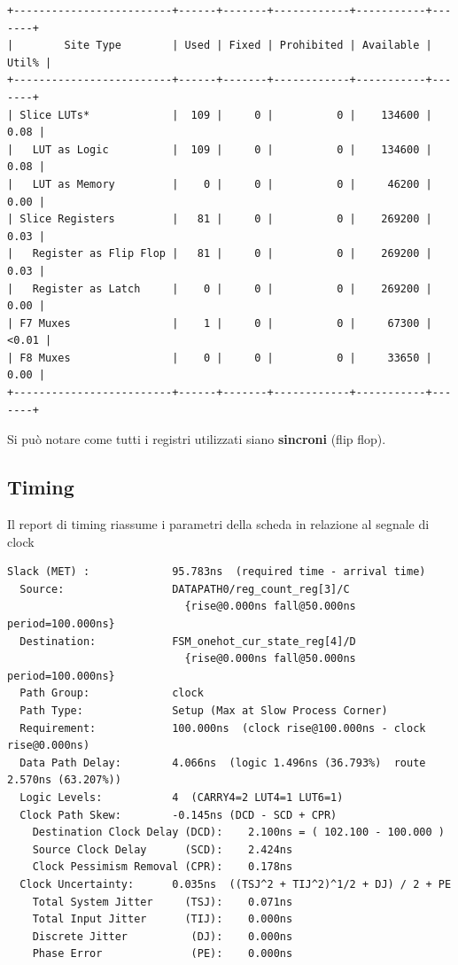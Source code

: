 \documentclass[a4paper]{report}
\begin{document}
\begin{verbatim}
+-------------------------+------+-------+------------+-----------+-------+
|        Site Type        | Used | Fixed | Prohibited | Available | Util% |
+-------------------------+------+-------+------------+-----------+-------+
| Slice LUTs*             |  109 |     0 |          0 |    134600 |  0.08 |
|   LUT as Logic          |  109 |     0 |          0 |    134600 |  0.08 |
|   LUT as Memory         |    0 |     0 |          0 |     46200 |  0.00 |
| Slice Registers         |   81 |     0 |          0 |    269200 |  0.03 |
|   Register as Flip Flop |   81 |     0 |          0 |    269200 |  0.03 |
|   Register as Latch     |    0 |     0 |          0 |    269200 |  0.00 |
| F7 Muxes                |    1 |     0 |          0 |     67300 | <0.01 |
| F8 Muxes                |    0 |     0 |          0 |     33650 |  0.00 |
+-------------------------+------+-------+------------+-----------+-------+
\end{verbatim}

Si può notare come tutti i registri utilizzati siano    \textbf{sincroni} (flip flop).

\subsection{Timing}
Il report di timing riassume i parametri della scheda in relazione al segnale di clock

\begin{verbatim}
Slack (MET) :             95.783ns  (required time - arrival time)
  Source:                 DATAPATH0/reg_count_reg[3]/C
                            {rise@0.000ns fall@50.000ns period=100.000ns}
  Destination:            FSM_onehot_cur_state_reg[4]/D
                            {rise@0.000ns fall@50.000ns period=100.000ns}
  Path Group:             clock
  Path Type:              Setup (Max at Slow Process Corner)
  Requirement:            100.000ns  (clock rise@100.000ns - clock rise@0.000ns)
  Data Path Delay:        4.066ns  (logic 1.496ns (36.793%)  route 2.570ns (63.207%))
  Logic Levels:           4  (CARRY4=2 LUT4=1 LUT6=1)
  Clock Path Skew:        -0.145ns (DCD - SCD + CPR)
    Destination Clock Delay (DCD):    2.100ns = ( 102.100 - 100.000 ) 
    Source Clock Delay      (SCD):    2.424ns
    Clock Pessimism Removal (CPR):    0.178ns
  Clock Uncertainty:      0.035ns  ((TSJ^2 + TIJ^2)^1/2 + DJ) / 2 + PE
    Total System Jitter     (TSJ):    0.071ns
    Total Input Jitter      (TIJ):    0.000ns
    Discrete Jitter          (DJ):    0.000ns
    Phase Error              (PE):    0.000ns
\end{verbatim}
\end{document}
